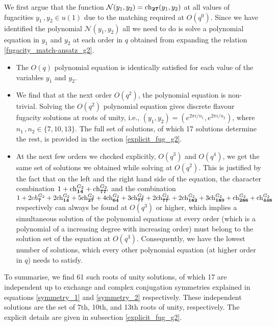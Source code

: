 \documentclass[a4paper,12pt]{article}
\begin{document}
We first argue that the function $\mathcal{N}(y_1,y_2)=\mathrm{ch}_{\bf 27}(y_1,y_2)$ at all values of fugacities $y_1\, ,y_2\in u(1)$ due to the matching required at $\textit{O}(q^0)$. Since we have identified the polynomial $\mathcal{N}(y_1,y_2)$ all we need to do is solve a polynomial equation in $y_1$ and $y_2$ at each order in $q$ obtained from expanding the relation \eqref{fugacity_match-ansatz_g2}.
\begin{itemize}
    \item The $\textit{O}(q)$ polynomial equation is identically satisfied for each value of the variables $y_1$ and $y_2$.
    \item We find that at the next order $\textit{O}(q^2)$, the polynomial equation is non-trivial. Solving the $\textit{O}(q^2)$ polynomial equation gives discrete flavour fugacity solutions at roots of unity, i.e., $(y_1,y_2)=(e^{2\pi i /n_1},e^{2\pi i /n_2})$, where $n_1\, ,n_2\in \{7,10,13\}$. The full set of solutions, of which 17 solutions determine the rest, is provided in the section \ref{explicit_fug_g2}.
    \item At the next few orders we checked explicitly, $\textit{O}(q^3)$ and $\textit{O}(q^4)$, we get the same set of solutions we obtained while solving at $\textit{O}(q^2)$. This is justified by the fact that on the left and the right hand side of the equation, the character combination $1+\mathrm{ch}^{G_2}_{\bf 14}+\mathrm{ch}^{G_2}_{\bf 77'}$ and the combination $1+2ch^{G_2}_{\bf 7}+2\mathrm{ch}^{G_2}_\mathbf{14}+5\mathrm{ch}^{G_2}_\mathbf{27}+4\mathrm{ch}^{G_2}_\mathbf{64}+3\mathrm{ch}^{G_2}_\mathbf{77}+2\mathrm{ch}^{G_2}_\mathbf{77'}+2\mathrm{ch}^{G_2}_\mathbf{182}+3\mathrm{ch}^{G_2}_\mathbf{189}+\mathrm{ch}^{G_2}_{\bf 286}+\mathrm{ch}^{G_2}_{\bf 448}$ respectively can always be found at $\textit{O}(q^3)$ or higher, which implies a simultaneous solution of the polynomial equations at every order (which is a polynomial of a increasing degree with increasing order) must belong to the solution set of the equation at $\textit{O}(q^3)$.  Consequently, we have the lowest number of solutions, which every other polynomial equation (at higher order in $q$) needs to satisfy. 
\end{itemize}

To summarise, we find 61 such roots of unity solutions, of which 17 are independent up to exchange and complex conjugation symmetries explained in equations \eqref{symmetry_1} and \eqref{symmetry_2} respectively. These independent solutions are the set of 7th, 10th, and 13th roots of unity, respectively. The explicit details are given in subsection \ref{explicit_fug_g2}.
\end{document}
